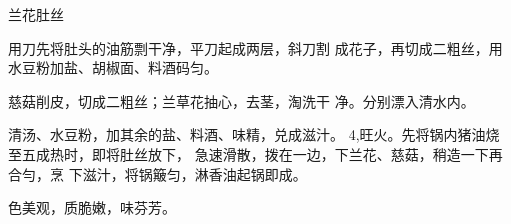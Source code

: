 \begin{recipe}{兰花肚丝}

\ingredients


\cooking

\step 用刀先将肚头的油筋剽干净，平刀起成两层，斜刀割 成花子，再切成二粗丝，用水豆粉加盐、胡椒面、料酒码匀。

\step 慈菇削皮，切成二粗丝；兰草花抽心，去茎，淘洗干 净。分别漂入清水内。

\step 清汤、水豆粉，加其余的盐、料酒、味精，兑成滋汁。 4,旺火。先将锅内猪油烧至五成热时，即将肚丝放下， 急速滑散，拨在一边，下兰花、慈菇，稍造一下再合勻，烹 下滋汁，将锅簸匀，淋香油起锅即成。

\notes

色美观，质脆嫩，味芬芳。

\end{recipe}


